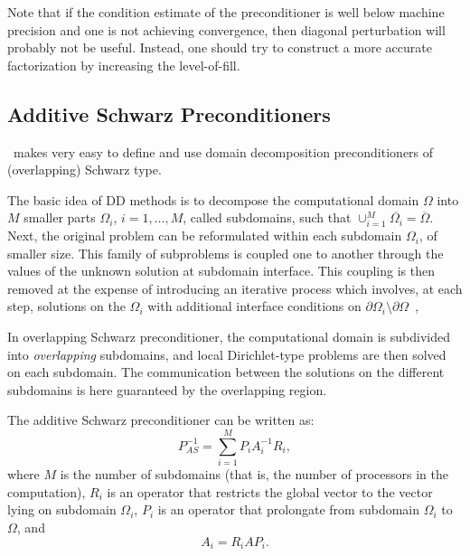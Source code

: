 \begin{remark}
Note that if the condition estimate of the preconditioner is
well below machine precision and one is not achieving
convergence, then diagonal perturbation will probably not be useful.
Instead, one should try to construct a more accurate factorization by
increasing the level-of-fill.
\end{remark}

\subsection{Additive Schwarz Preconditioners}
\label{sec:additive}

\ifpack\ makes very easy to define and use domain decomposition
preconditioners of (overlapping) Schwarz type.

The basic idea of DD methods is to decompose the
computational domain $\Omega$ into $M$ smaller parts $\Omega_i$,
$i=1,\ldots,M$, called subdomains, such that $\cup_{i=1}^{M}
\overline{\Omega_i} = \overline{\Omega}$.  Next, the original problem can
be reformulated within each subdomain $\Omega_i$, of smaller size. This
family of subproblems is coupled one to another through the values of the
unknown solution at subdomain interface. This coupling is then removed at
the expense of introducing an iterative process which involves, at each
step, solutions on the $\Omega_i$ with additional interface conditions on
$\partial \Omega_i \setminus \partial \Omega$~\cite{QV2, smith96parallel},

In overlapping Schwarz preconditioner, the computational domain is
subdivided into {\sl overlapping} subdomains, and local Dirichlet-type
problems are then solved on each subdomain.  The communication between the
solutions on the different subdomains is here guaranteed by the overlapping
region. 

The additive Schwarz preconditioner can be written as:
\begin{equation}
\label{eq:as}
P_{AS}^{-1} = \sum_{i=1}^M P_i A_i^{-1} R_i ,
\end{equation}
where $M$ is the number of subdomains (that is, the number of processors in
the computation), $R_i$ is an operator that restricts the global 
vector to the vector lying on subdomain $\Omega_i$, $P_i$ is an operator that
prolongate from subdomain $\Omega_i$ to $\Omega$, and
\begin{equation}
\label{eq:Ai}
A_i = R_i A P_i.
\end{equation}

